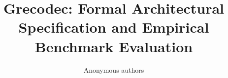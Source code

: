 \title{\textbf{Grecodec: Formal Architectural Specification and Empirical Benchmark Evaluation}}

\author{Anonymous authors}
